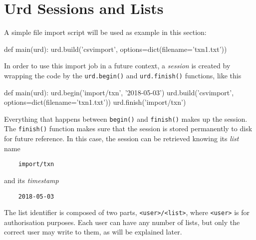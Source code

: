 







\section{Urd Sessions and Lists}

A simple file import script will be used as example in this section:
\begin{python}
def main(urd):
    urd.build('csvimport', options=dict(filename='txn1.txt'))
\end{python}
In order to use this import job in a future context,
a \textsl{session} is created by wrapping the code by
the \texttt{urd.begin()} and \texttt{urd.finish()} functions, like this
\begin{python}
def main(urd):
    urd.begin('import/txn', '2018-05-03')
    urd.build('csvimport', options=dict(filename='txn1.txt'))
    urd.finish('import/txn')
\end{python}
Everything that happens between \texttt{begin()} and \texttt{finish()}
makes up the session.  The \texttt{finish()} function makes sure that
the session is stored permanently to disk for future reference.  In
this case, the session can be retrieved knowing its \textsl{list} name
\begin{verbatim}
    import/txn
\end{verbatim}
and its \textsl{timestamp}
\begin{verbatim}
    2018-05-03
\end{verbatim}
The list identifier is composed of two parts, \texttt{<user>/<list>}, where
\texttt{<user>} is for authorisation purposes.  Each user can
have any number of lists, but only the correct user may write to them,
as will be explained later.

